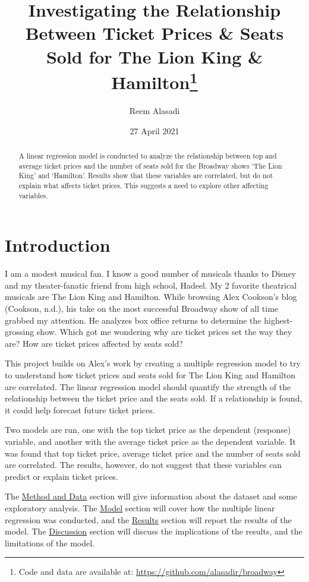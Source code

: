 \documentclass[
]{article}
\title{Investigating the Relationship Between Ticket Prices \& Seats Sold for The Lion King \& Hamilton\thanks{Code and data are available at: \url{https://github.com/alasadir/broadway}}}
\author{Reem Alasadi}
\date{27 April 2021}
\begin{document}
\maketitle
\begin{abstract}
A linear regression model is conducted to analyze the relationship between top and average ticket prices and the number of seats sold for the Broadway shows `The Lion King' and `Hamilton'. Results show that these variables are correlated, but do not explain what affects ticket prices. This suggests a need to explore other affecting variables.
\end{abstract}

\newpage

\hypertarget{introduction}{%
\section{Introduction}\label{introduction}}

I am a modest musical fan. I know a good number of musicals thanks to Disney and my theater-fanatic friend from high school, Hadeel. My 2 favorite theatrical musicals are The Lion King and Hamilton. While browsing Alex Cookson's blog (Cookson, n.d.), his take on the most successful Broadway show of all time grabbed my attention. He analyzes box office returns to determine the highest-grossing show. Which got me wondering why are ticket prices set the way they are? How are ticket prices affected by seats sold?

This project builds on Alex's work by creating a multiple regression model to try to understand how ticket prices and seats sold for The Lion King and Hamilton are correlated. The linear regression model should quantify the strength of the relationship between the ticket price and the seats sold. If a relationship is found, it could help forecast future ticket prices.

Two models are run, one with the top ticket price as the dependent (response) variable, and another with the average ticket price as the dependent variable. It was found that top ticket price, average ticket price and the number of seats sold are correlated. The results, however, do not suggest that these variables can predict or explain ticket prices.

The \protect\hyperlink{Mux5cux26D}{Method and Data} section will give information about the dataset and some exploratory analysis. The \protect\hyperlink{model}{Model} section will cover how the multiple linear regression was conducted, and the \protect\hyperlink{results}{Results} section will report the results of the model. The \protect\hyperlink{discusssion}{Discussion} section will discuss the implications of the results, and the limitations of the model.
\end{document}
